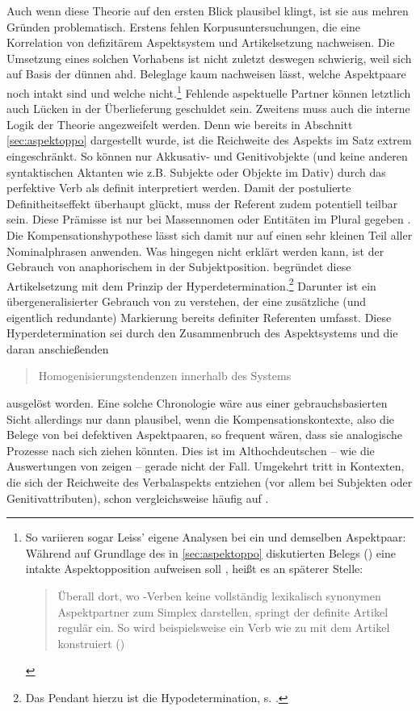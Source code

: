 Auch wenn diese Theorie auf den ersten Blick plausibel klingt, ist sie aus mehren Gründen problematisch. Erstens fehlen Korpusuntersuchungen, die eine Korrelation von defizitärem Aspektsystem und Artikelsetzung nachweisen. Die Umsetzung eines solchen Vorhabens ist nicht zuletzt deswegen schwierig, weil sich auf Basis der dünnen ahd. Beleglage kaum nachweisen lässt, welche Aspektpaare noch intakt sind und welche nicht.\footnote{So variieren sogar Leiss' eigene Analysen bei ein und demselben Aspektpaar: Während  auf Grundlage des in \ref{sec:aspektoppo} diskutierten Belegs () eine intakte Aspektopposition aufweisen soll \parencite[171]{Leiss2000}, heißt es an späterer Stelle: \blockcquote[182]{Leiss2000}{Überall dort, wo -Verben keine vollständig lexikalisch synonymen Aspektpartner zum Simplex darstellen, springt der definite Artikel regulär ein. So wird beispielsweise ein Verb wie   zu   mit dem Artikel konstruiert ()}.} Fehlende aspektuelle Partner können letztlich auch Lücken in der Überlieferung geschuldet sein. Zweitens muss auch die interne Logik der Theorie angezweifelt werden. Denn wie bereits in Abschnitt \ref{sec:aspektoppo} dargestellt wurde, ist die Reichweite des Aspekts im Satz extrem eingeschränkt. So können nur Akkusativ- und Genitivobjekte (und keine anderen syntaktischen Aktanten wie z.B. Subjekte oder Objekte im Dativ) durch das perfektive Verb als definit interpretiert werden. Damit der postulierte Definitheitseffekt überhaupt glückt, muss der Referent zudem potentiell teilbar sein. Diese Prämisse ist nur bei Massennomen oder Entitäten im Plural gegeben \parencite{Heindl2016}. Die Kompensationshypothese lässt sich damit nur auf einen sehr kleinen Teil aller Nominalphrasen anwenden. Was hingegen nicht erklärt werden kann, ist der Gebrauch von anaphorischem  in der Subjektposition. \textcite{Leiss2000,Leiss2010} begründet diese Artikelsetzung mit dem Prinzip der Hyperdetermination.\footnote{Das Pendant hierzu ist die Hypodetermination, s. \textcite{Leiss2000}.} Darunter ist ein übergeneralisierter Gebrauch von  zu verstehen, der eine zusätzliche (und eigentlich redundante) Markierung bereits definiter Referenten umfasst. Diese Hyperdetermination sei durch den Zusammenbruch des Aspektsystems und die daran anschießenden \blockcquote[196]{Leiss2000}{Homogenisierungstendenzen innerhalb des Systems} ausgelöst worden. Eine solche Chronologie wäre aus einer gebrauchsbasierten Sicht allerdings nur dann plausibel, wenn die Kompensationskontexte, also die Belege von  bei defektiven Aspektpaaren, so frequent wären, dass sie analogische Prozesse nach sich ziehen könnten. Dies ist im Althochdeutschen -- wie die Auswertungen von \textcite[170--181]{Leiss2000} zeigen -- gerade nicht der Fall. 
Umgekehrt tritt  in Kontexten, die sich der Reichweite des Verbalaspekts entziehen (vor allem bei Subjekten oder Genitivattributen), schon vergleichsweise häufig auf \parencite[s. z.B.][]{Oubouzar1992}.  

